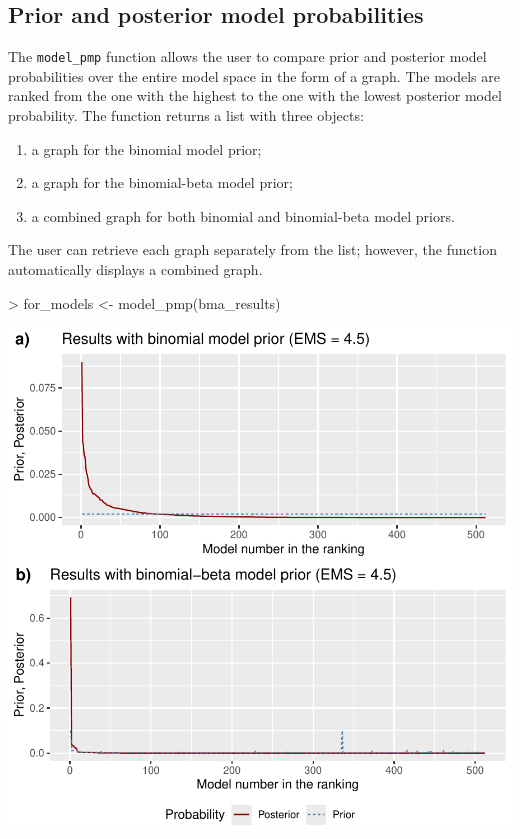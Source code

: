 \documentclass[a4paper]{article}
\begin{document}
\subsection{Prior and posterior model probabilities}
The \verb+model_pmp+ function allows the user to compare prior and posterior model probabilities over the entire model space in the form of a graph.
The models are ranked from the one with the highest to the one with the lowest posterior model probability.
The function returns a list with three objects:
\begin{enumerate}
    \item a graph for the binomial model prior;
    \item a graph for the binomial-beta model prior;
    \item a combined graph for both binomial and binomial-beta model priors.
\end{enumerate}
The user can retrieve each graph separately from the list; however, the function automatically displays a combined graph.
\begin{Schunk}
\begin{Sinput}
> for_models <- model_pmp(bma_results)
\end{Sinput}
\end{Schunk}
\includegraphics{bdsm_vignette-014}
\end{document}
